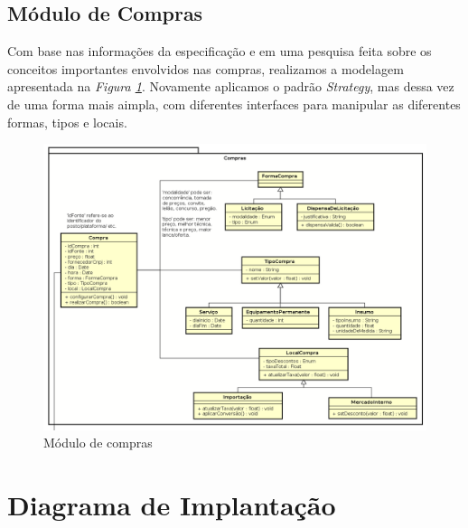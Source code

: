 \documentclass[a4paper,10pt]{article}
\begin{document}
\subsection{Módulo de Compras}

Com base nas informações da especificação e em uma pesquisa feita sobre os
conceitos importantes envolvidos nas compras, realizamos a modelagem apresentada
na \emph{Figura \ref{compras}}. Novamente aplicamos o padrão \emph{Strategy}, mas
dessa vez de uma forma mais aimpla, com diferentes interfaces para manipular as
diferentes formas, tipos e locais. \par

\begin{figure}[ht]
  \centering
  \includegraphics[width=1\textwidth, keepaspectratio=true]{images/compras.png}
  \caption {Módulo de compras}
  \label {compras}
\end{figure}


\newpage
\section{Diagrama de Implantação}
\end{document}
